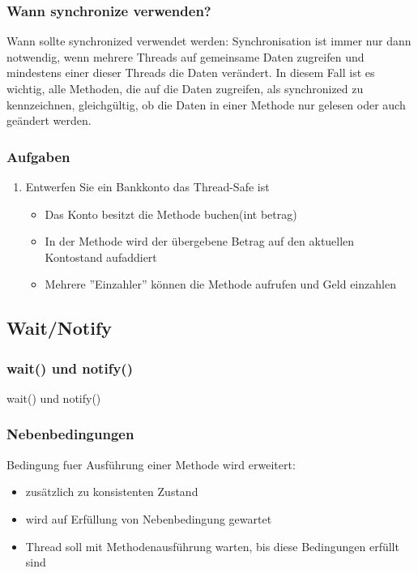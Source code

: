 \begin{frame}[fragile]
	\frametitle{Wann synchronize verwenden?}
	\begin{exampleblock}{Wann sollte synchronized verwendet werden:}
	Synchronisation ist immer nur dann notwendig, wenn mehrere Threads auf
	gemeinsame Daten zugreifen und mindestens einer dieser Threads die Daten
	verändert. In diesem Fall ist es wichtig, alle Methoden, die auf die Daten
	zugreifen, als synchronized zu kennzeichnen, gleichgültig, ob die Daten in
	einer Methode nur gelesen oder auch geändert werden.
	\end{exampleblock}
\end{frame}

\begin{frame}
	\frametitle{Aufgaben}
	\begin{enumerate}
	  \item Entwerfen Sie ein Bankkonto das Thread-Safe ist
	  \begin{itemize}
	    \item Das Konto besitzt die Methode buchen(int betrag)
	    \item In der Methode wird der übergebene Betrag auf den aktuellen
	    Kontostand aufaddiert
	    \item Mehrere ''Einzahler'' können die Methode aufrufen und Geld einzahlen
	  \end{itemize}
	\end{enumerate}
\end{frame}

\subsection{Wait/Notify}
\begin{frame}[fragile]
	\frametitle{wait() und notify()}
	\huge wait() und notify()
\end{frame}

\begin{frame}[fragile]
	\frametitle{Nebenbedingungen}
	Bedingung fuer Ausführung einer Methode wird erweitert:
	\begin{itemize}
	  \item zusätzlich zu konsistenten Zustand
	  \item wird auf Erfüllung von Nebenbedingung gewartet
	  \item Thread soll mit Methodenausführung warten, bis diese Bedingungen
	  erfüllt sind
	\end{itemize}
\end{frame}

